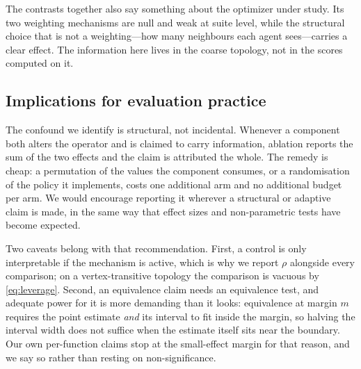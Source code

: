 The contrasts together also say something about the optimizer under study. Its
two weighting mechanisms are null and weak at suite level, while the structural
choice that is not a weighting---how many neighbours each agent sees---carries
a clear effect. The information here lives in the coarse topology, not in the
scores computed on it.

\subsection{Implications for evaluation practice}

The confound we identify is structural, not incidental. Whenever a component
both alters the operator and is claimed to carry information, ablation reports
the sum of the two effects and the claim is attributed the whole. The remedy is
cheap: a permutation of the values the component consumes, or a randomisation
of the policy it implements, costs one additional arm and no additional budget
per arm. We would encourage reporting it wherever a structural or adaptive
claim is made, in the same way that effect sizes and non-parametric tests have
become expected.

Two caveats belong with that recommendation. First, a control is only
interpretable if the mechanism is active, which is why we report $\rho$
alongside every comparison; on a vertex-transitive topology the comparison is
vacuous by \eqref{eq:leverage}. Second, an equivalence claim needs an
equivalence test, and adequate power for it is more demanding than it looks:
equivalence at margin $m$ requires the point estimate \emph{and} its interval
to fit inside the margin, so halving the interval width does not suffice when
the estimate itself sits near the boundary. Our own per-function claims stop
at the small-effect margin for that reason, and we say so rather than resting
on non-significance.
